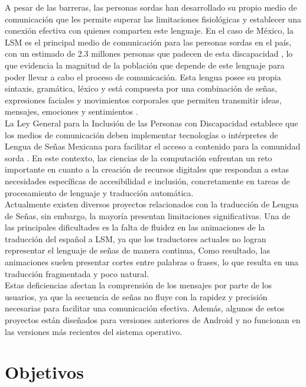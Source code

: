 A pesar de las barreras, las personas sordas han desarrollado su propio medio de comunicación que les permite superar las limitaciones fisiológicas y establecer una conexión efectiva con quienes comparten este lenguaje. En el caso de México, la LSM es el principal medio de comunicación para las personas sordas en el país, con un estimado de 2.3 millones personas que padecen de esta discapacidad \cite{ref3}, lo que evidencia la magnitud de la población que depende de este lenguaje para poder llevar a cabo el proceso de comunicación. Esta lengua posee su propia sintaxis, gramática, léxico y está compuesta por una combinación de señas, expresiones faciales y movimientos corporales que permiten transmitir ideas, mensajes, emociones y sentimientos \cite{ref4}.\\

La Ley General para la Inclusión de las Personas con Discapacidad establece que los medios de comunicación deben implementar tecnologías o intérpretes de Lengua de Señas Mexicana para facilitar el acceso a contenido para la comunidad sorda \cite{ref4}. En este contexto, las ciencias de la computación enfrentan un reto importante en cuanto a la creación de recursos digitales que respondan a estas necesidades específicas de accesibilidad e inclusión, concretamente en tareas de procesamiento de lenguaje y traducción automática.\\

Actualmente existen diversos proyectos relacionados con la traducción de Lengua de Señas, sin embargo, la mayoría presentan limitaciones significativas. Una de las principales dificultades es la falta de fluidez en las animaciones de la traducción del español a LSM, ya que los traductores actuales no logran representar el lenguaje de señas de manera continua, Como resultado, las animaciones suelen presentar cortes entre palabras o frases, lo que resulta en una traducción fragmentada y poco natural.\\

Estas deficiencias afectan la comprensión de los mensajes por parte de los usuarios, ya que la secuencia de señas no fluye con la rapidez y precisión necesarias para facilitar una comunicación efectiva. Además, algunos de estos proyectos están diseñados para versiones anteriores de Android y no funcionan en las versiones más recientes del sistema operativo.\\


\section{Objetivos}
